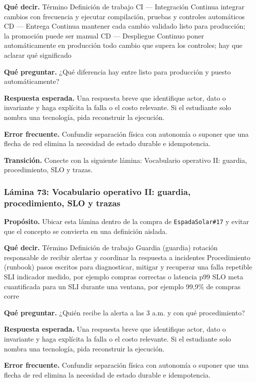 \documentclass[variant=docente,cover=institutional,mode=screen]{ua-engineering-v6-article}
\begin{document}
\textbf{Qué decir.} Término Definición de trabajo CI — Integración Continua integrar cambios con frecuencia y ejecutar compilación, pruebas y controles automáticos CD — Entrega Continua mantener cada cambio validado listo para producción; la promoción puede ser manual CD — Despliegue Continuo poner automáticamente en producción todo cambio que supera los controles; hay que aclarar qué significado 

\textbf{Qué preguntar.} ¿Qué diferencia hay entre listo para producción y puesto automáticamente?

\textbf{Respuesta esperada.} Una respuesta breve que identifique actor, dato o invariante y haga explícita la falla o el costo relevante. Si el estudiante solo nombra una tecnología, pida reconstruir la ejecución.

\textbf{Error frecuente.} Confundir separación física con autonomía o suponer que una flecha de red elimina la necesidad de estado durable e idempotencia.

\textbf{Transición.} Conecte con la siguiente lámina: Vocabulario operativo II: guardia, procedimiento, SLO y trazas.

\subsubsection*{Lámina 73: Vocabulario operativo II: guardia, procedimiento, SLO y trazas}
\textbf{Propósito.} Ubicar esta lámina dentro de la compra de \texttt{EspadaSolar\#17} y evitar que el concepto se convierta en una definición aislada.

\textbf{Qué decir.} Término Definición de trabajo Guardia (guardia) rotación responsable de recibir alertas y coordinar la respuesta a incidentes Procedimiento (runbook) pasos escritos para diagnosticar, mitigar y recuperar una falla repetible SLI indicador medido, por ejemplo compras correctas o latencia p99 SLO meta cuantificada para un SLI durante una ventana, por ejemplo 99,9\% de compras corre

\textbf{Qué preguntar.} ¿Quién recibe la alerta a las 3 a.m. y con qué procedimiento?

\textbf{Respuesta esperada.} Una respuesta breve que identifique actor, dato o invariante y haga explícita la falla o el costo relevante. Si el estudiante solo nombra una tecnología, pida reconstruir la ejecución.

\textbf{Error frecuente.} Confundir separación física con autonomía o suponer que una flecha de red elimina la necesidad de estado durable e idempotencia.
\end{document}
